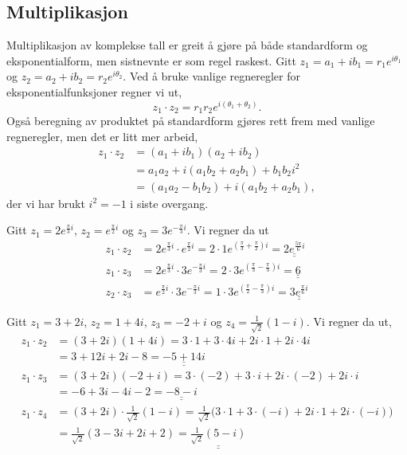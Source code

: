 \documentclass[a4paper,norsk,12pt]{article}
\newcommand{\ans}[1]{\underline{\underline{#1}}}
\newcounter{exa}
\begin{document}
\subsection{Multiplikasjon}
Multiplikasjon av komplekse tall er greit å gjøre på både standardform og eksponentialform, men sistnevnte er som regel raskest. Gitt $z_1 = a_1 + ib_1 = r_1e^{i\theta_1}$ og $z_2 = a_2+ib_2 = r_2e^{i\theta_2}$. Ved å bruke vanlige regneregler for eksponentialfunksjoner regner vi ut,
\begin{displaymath}
	z_1\cdot z_2 = r_1r_2e^{i(\theta_1+\theta_2)}.
\end{displaymath}
Også beregning av produktet på standardform gjøres rett frem med vanlige regneregler, men det er litt mer arbeid,
\begin{align*}
	z_1\cdot z_2 &= (a_1+ib_1)(a_2+ib_2) \\
		&= a_1a_2 + i(a_1b_2+a_2b_1)+b_1b_2i^2 \\
		&= (a_1a_2-b_1b_2) + i (a_1b_2+a_2b_1),
\end{align*}
der vi har brukt $i^2=-1$ i siste overgang.
\begin{texample}
Gitt $z_1 = 2e^{\frac{\pi}{3}i}$, $z_2 = e^{\frac{\pi}{2}i}$ og $z_3 = 3e^{-\frac{\pi}{3}i}$. Vi regner da ut
\begin{align*}
	z_1\cdot z_2 &= 2e^{\frac{\pi}{3}i}\cdot e^{\frac{\pi}{2}i} = 2\cdot1 e^{\left(\frac{\pi}{3}+\frac{\pi}{2}\right)i} = \ans{2e^{\frac{5\pi}{6}i}} \\
	z_1\cdot z_3 &= 2e^{\frac{\pi}{3}i}\cdot 3e^{-\frac{\pi}{3}i} = 2\cdot3 e^{\left(\frac{\pi}{3}-\frac{\pi}{3}\right)i} = \ans{6} \\
	z_2\cdot z_3 &= e^{\frac{\pi}{2}i}\cdot 3e^{-\frac{\pi}{3}i} = 1\cdot3e^{\left(\frac{\pi}{2}-\frac{\pi}{3}\right)i} = \ans{3e^{\frac{\pi}{6}i}}
\end{align*}
\end{texample}

\begin{texample}
Gitt $z_1 = 3 + 2i$, $z_2=1 + 4i$, $z_3 = -2 + i$ og $z_4 = \frac{1}{\sqrt{2}}(1-i)$. Vi regner da ut,
\begin{align*}
	z_1\cdot z_2 &= (3+2i)(1+4i) = 3\cdot1 + 3\cdot4i + 2i\cdot1 + 2i\cdot 4i \\
	&= 3 +12i+2i -8 = \ans{-5+14i} \\[12pt]
	z_1\cdot z_3 &= (3+2i)(-2+i) = 3\cdot(-2)+3\cdot i+2i\cdot(-2) + 2i\cdot i \\
	&= -6 + 3i -4i -2 = \ans{-8 -i} \\[12pt]
	z_1\cdot z_4 &= (3+2i)\cdot\frac{1}{\sqrt{2}}(1-i) = \frac{1}{\sqrt{2}} \Big(3\cdot 1 + 3\cdot(-i) + 2i\cdot1 + 2i\cdot(-i) \Big)\\
	&= \frac{1}{\sqrt{2}}\left(3-3i+2i+2\right) = \ans{\frac{1}{\sqrt{2}}(5-i)}
\end{align*}
\end{texample}
\end{document}

